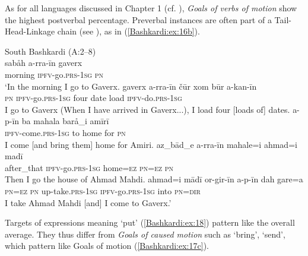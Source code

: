 \documentclass[output=paper,colorlinks,citecolor=brown]{langscibook}
\begin{document}
\begin{sloppypar}
As for all languages discussed in Chapter 1 (cf. ), \emph{Goals of verbs of motion} show the highest postverbal percentage. Preverbal instances are often part of a Tail-Head-Linkage chain (see ), as in (\ref{Bashkardi:ex:16b}).
\end{sloppypar}

\ea\label{Bashkardi:ex:16}
South Bashkardi (A:2--8) \\
\ea\label{Bashkardi:ex:16a}
\gll sabåh a-rra-īn gaverx \\
morning \textsc{ipfv-}go\textsc{.prs}\textsc{-1sg} \textsc{pn} \\
\glt `In the morning I go to Gaverx. 
\ex\label{Bashkardi:ex:16b}
\gll gaverx a-rra-īn čūr xom būr a-kan-īn \\
\textsc{pn} \textsc{ipfv-}go\textsc{.prs}\textsc{-1sg} four date load \textsc{ipfv-}do\textsc{.prs}\textsc{-1sg} \\
\glt I go to Gaverx (When I have arrived in Gaverx...), I load four [loads of] dates.
\ex\label{Bashkardi:ex:16c}
\gll a-p-īn ba mahala barå\_i amīrī \\
\textsc{ipfv-}come\textsc{.prs}\textsc{-1sg} to home for \textsc{pn} \\
\glt I come [and bring them] home for Amiri.
\ex\label{Bashkardi:ex:16d}
\gll az\_bād\_e a-rra-īn mahale=i ahmad=i madī \\
after\_that \textsc{ipfv-}go\textsc{.prs}\textsc{-1sg} home\textsc{=ez} \textsc{pn}\textsc{=ez} \textsc{pn} \\
\glt Then I go the house of Ahmad Mahdi.
\ex\label{Bashkardi:ex:16e}
\gll ahmad=i mādī or-gir-īn a-p-īn dah gare=a \\
\textsc{pn}\textsc{=ez} \textsc{pn} up-take\textsc{.prs}\textsc{-1sg} \textsc{ipfv-}go\textsc{.prs}\textsc{-1sg} into \textsc{pn}\textsc{=dir}\footnotemark \\
\glt I take Ahmad Mahdi [and] I come to Gaverx.'
\z
\z


Targets of expressions meaning `put' (\ref{Bashkardi:ex:18}) pattern like the overall average. They thus differ from \emph{Goals of caused motion} such as `bring', `send', which pattern like Goals of motion (\ref{Bashkardi:ex:17c}).
\end{document}
